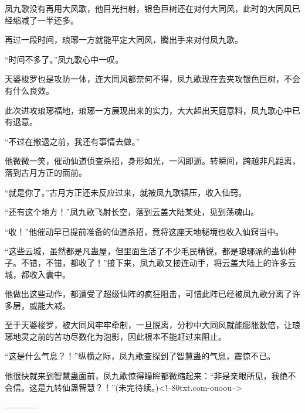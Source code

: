 \begin{this_body}
凤九歌没有再用大风歌，他目光扫射，银色巨树还在对付大同风，此时的大同风已经缩减了一半还多。

再过一段时间，琅琊一方就能平定大同风，腾出手来对付凤九歌。

“时间不多了。”凤九歌心中一叹。

天婆梭罗也是攻防一体，连大同风都奈何不得，凤九歌现在去夹攻银色巨树，不会有什么良效。

此次进攻琅琊福地，琅琊一方展现出来的实力，大大超出天庭意料，凤九歌心中已有退意。

“不过在撤退之前，我还有事情去做。”

他微微一笑，催动仙道侦查杀招，身形如光，一闪即逝。转瞬间，跨越非凡距离，落到古月方正的面前。

“就是你了。”古月方正还未反应过来，就被凤九歌镇压，收入仙窍。

“还有这个地方！”凤九歌飞射长空，落到云盖大陆某处，见到荡魂山。

“收！”他催动早已提前准备的仙道杀招，竟将这座天地秘境也收入仙窍当中。

“这些云城，虽然都是凡蛊屋，但里面生活了不少毛民精锐，都是琅琊派的蛊仙种子。不错，不错，都收了！”接下来，凤九歌又接连动手，将云盖大陆上的许多云城，都收入囊中。

他做出这些动作，都遭受了超级仙阵的疯狂阻击，可惜此阵已经被凤九歌分离了许多层，威能大减。

至于天婆梭罗，被大同风牢牢牵制，一旦脱离，分秒中大同风就能膨胀数倍，让琅琊地灵之前的苦功尽数化为泡影，因此根本不能赶过来阻止。

“这是什么气息？！”纵横之际，凤九歌查探到了智慧蛊的气息，震惊不已。

他很快就来到智慧蛊面前，凤九歌惊得瞳眸都微缩起来：“非是亲眼所见，我绝不会信。这是九转仙蛊智慧？！”(未完待续。)<!--80txt.com-ouoou-->

------------

\end{this_body}

